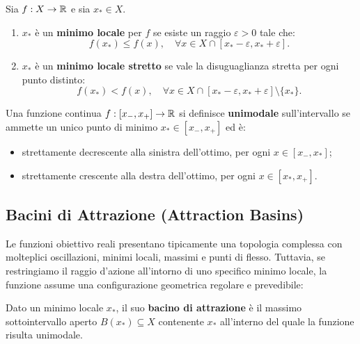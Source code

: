 \begin{definition}
Sia $f: X \to \mathbb{R}$ e sia $x_* \in X$.
\begin{enumerate}
    \item $x_*$ \`e un \textbf{minimo locale} per $f$ se esiste un raggio $\varepsilon > 0$ tale che:
    \begin{equation}
        f(x_*) \le f(x), \quad \forall x \in X \cap [x_* - \varepsilon, x_* + \varepsilon].
    \end{equation}
    \item $x_*$ \`e un \textbf{minimo locale stretto} se vale la disuguaglianza stretta per ogni punto distinto:
    \begin{equation}
        f(x_*) < f(x), \quad \forall x \in X \cap [x_* - \varepsilon, x_* + \varepsilon] \setminus \{x_*\}.
    \end{equation}
\end{enumerate}
\end{definition}

\begin{definition}
Una funzione continua $f: [x_-, x_+] \to \mathbb{R}$ si definisce \textbf{unimodale} sull'intervallo se ammette un unico punto di minimo $x_* \in [x_-, x_+]$ ed \`e:
\begin{itemize}
    \item strettamente decrescente alla sinistra dell'ottimo, per ogni $x \in [x_-, x_*]$;
    \item strettamente crescente alla destra dell'ottimo, per ogni $x \in [x_*, x_+]$.
\end{itemize}
\end{definition}

\subsection{Bacini di Attrazione (Attraction Basins)}
Le funzioni obiettivo reali presentano tipicamente una topologia complessa con molteplici oscillazioni, minimi locali, massimi e punti di flesso. Tuttavia, se restringiamo il raggio d'azione all'intorno di uno specifico minimo locale, la funzione assume una configurazione geometrica regolare e prevedibile:

\begin{definition}
Dato un minimo locale $x_*$, il suo \textbf{bacino di attrazione} \`e il massimo sottointervallo aperto $B(x_*) \subseteq X$ contenente $x_*$ all'interno del quale la funzione risulta unimodale.
\end{definition}

